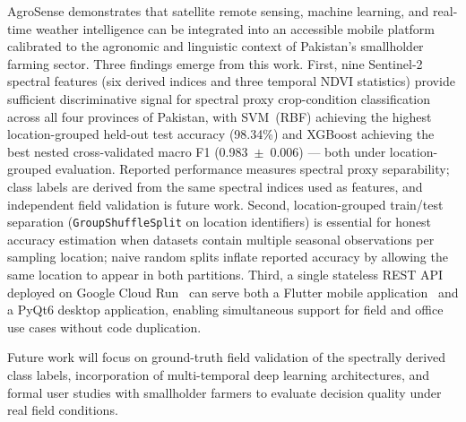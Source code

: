 \documentclass[conference]{IEEEtran}
\begin{document}
AgroSense demonstrates that satellite remote sensing, machine learning, and
real-time weather intelligence can be integrated into an accessible mobile
platform calibrated to the agronomic and linguistic context of Pakistan's
smallholder farming sector. Three findings emerge from this work. First, nine
Sentinel-2 spectral features (six derived indices and three temporal NDVI
statistics) provide sufficient discriminative signal for spectral proxy
crop-condition classification across all four provinces of Pakistan, with
SVM~(RBF) achieving the highest location-grouped held-out test accuracy
(98.34\%) and XGBoost achieving the best nested cross-validated macro F1
(0.983~$\pm$~0.006) — both under location-grouped evaluation. Reported
performance measures spectral proxy separability; class labels are derived
from the same spectral indices used as features, and independent field
validation is future work.
Second, location-grouped train/test separation (\texttt{GroupShuffleSplit} on
location identifiers) is essential for honest accuracy estimation when datasets
contain multiple seasonal observations per sampling location; naive random
splits inflate reported accuracy by allowing the same location to appear in
both partitions.
Third, a single stateless REST API deployed on Google Cloud
Run~\cite{googlecloudrun,fastapi} can serve both a Flutter mobile
application~\cite{flutter} and a PyQt6 desktop application, enabling
simultaneous support for field and office use cases without code duplication.

Future work will focus on ground-truth field validation of the spectrally
derived class labels, incorporation of multi-temporal deep learning
architectures, and formal user studies with smallholder farmers to evaluate
decision quality under real field conditions.
\end{document}
